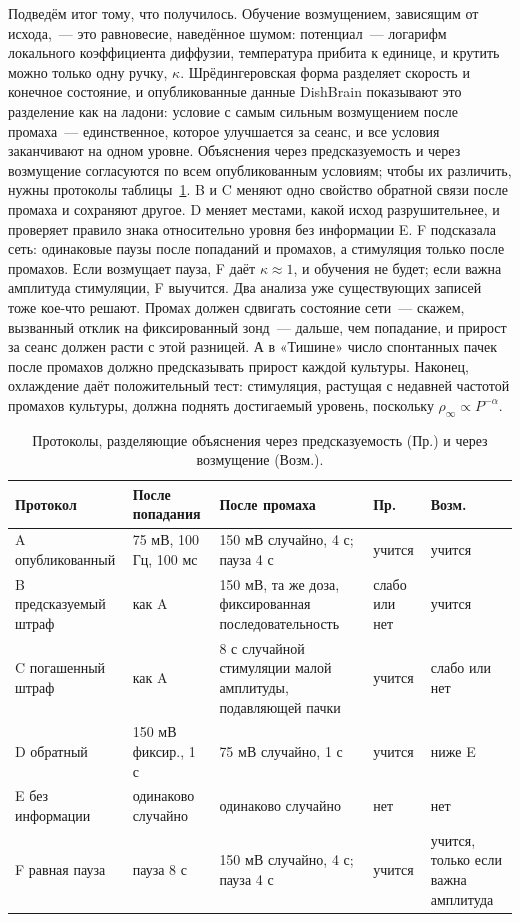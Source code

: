 \documentclass[pre,twocolumn,superscriptaddress,showpacs=false,amsmath,amssymb,nofootinbib]{revtex4-2}
\begin{document}
Подведём итог тому, что получилось. Обучение возмущением, зависящим от исхода,~--- это равновесие, наведённое шумом: потенциал~--- логарифм локального коэффициента диффузии, температура прибита к единице, и крутить можно только одну ручку, $\kappa$. Шрёдингеровская форма разделяет скорость и конечное состояние, и опубликованные данные DishBrain показывают это разделение как на ладони: условие с самым сильным возмущением после промаха~--- единственное, которое улучшается за сеанс, и все условия заканчивают на одном уровне. Объяснения через предсказуемость и через возмущение согласуются по всем опубликованным условиям; чтобы их различить, нужны протоколы таблицы~\ref{tab:protocols}. B и C меняют одно свойство обратной связи после промаха и сохраняют другое. D меняет местами, какой исход разрушительнее, и проверяет правило знака относительно уровня без информации E. F подсказала сеть: одинаковые паузы после попаданий и промахов, а стимуляция только после промахов. Если возмущает пауза, F даёт $\kappa\approx1$, и обучения не будет; если важна амплитуда стимуляции, F выучится. Два анализа уже существующих записей тоже кое-что решают. Промах должен сдвигать состояние сети~--- скажем, вызванный отклик на фиксированный зонд~--- дальше, чем попадание, и прирост за сеанс должен расти с этой разницей. А в «Тишине» число спонтанных пачек после промахов должно предсказывать прирост каждой культуры. Наконец, охлаждение даёт положительный тест: стимуляция, растущая с недавней частотой промахов культуры, должна поднять достигаемый уровень, поскольку $\rho_\infty\propto P^{-\alpha}$.

\begin{table}[b]
\caption{Протоколы, разделяющие объяснения через предсказуемость (Пр.) и через возмущение (Возм.).}
\label{tab:protocols}
\footnotesize
\begin{ruledtabular}
\begin{tabular}{p{1.55cm}p{1.4cm}p{2.2cm}p{0.95cm}p{1.2cm}}
Протокол & После попадания & После промаха & Пр. & Возм. \\
\hline
A опубликованный & 75 мВ, 100 Гц, 100 мс & 150 мВ случайно, 4 с; пауза 4 с & учится & учится \\
B предсказуемый штраф & как A & 150 мВ, та же доза, фиксированная последовательность & слабо или нет & учится \\
C погашенный штраф & как A & 8 с случайной стимуляции малой амплитуды, подавляющей пачки & учится & слабо или нет \\
D обратный & 150 мВ фиксир., 1 с & 75 мВ случайно, 1 с & учится & ниже E \\
E без информации & одинаково случайно & одинаково случайно & нет & нет \\
F равная пауза & пауза 8 с & 150 мВ случайно, 4 с; пауза 4 с & учится & учится, только если важна амплитуда \\
\end{tabular}
\end{ruledtabular}
\end{table}
\end{document}
